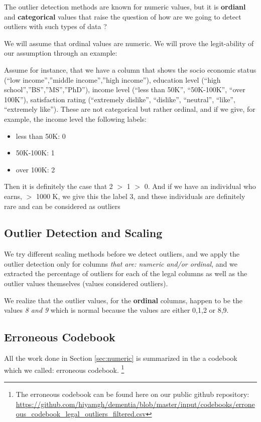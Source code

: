 \documentclass{article}
\begin{document}
\noindent The outlier detection methods are known for numeric values, but it is \textbf{ordianl} and \textbf{categorical} values that raise the question of how are we going to detect outliers with such types of data ?

\noindent We will assume that ordinal values are numeric. We will prove the legit-ability of our assumption through an example:

\noindent Assume for instance, that we have a column that shows the socio economic status (“low income”,”middle income”,”high income”), education level (“high school”,”BS”,”MS”,”PhD”), income level (“less than 50K”, “50K-100K”, “over 100K”), satisfaction rating (“extremely dislike”, “dislike”, “neutral”, “like”, “extremely like”). These are not categorical but rather ordinal, and if we give, for example, the income level the following labels:
\begin{itemize}
    \item less than 50K: 0
    \item 50K-100K: 1
    \item over 100K: 2
\end{itemize}
Then it is definitely the case that 2 $>$ 1 $>$ 0. And if we have an individual who earns, $>$ 1000 K, we give this the label 3, and these individuals are definitely rare and can be considered as outliers

\subsection{Outlier Detection and Scaling}
We try different scaling methods before we detect outliers, and we apply the outlier detection only for columns \textit{that are: numeric and/or ordinal}, and we extracted the percentage of outliers for each of the legal columns as well as the outlier values themselves (values considered outliers).

\noindent We realize that the outlier values, for the \textbf{ordinal} columns, happen to be the values \textit{8 and 9} which is normal because the values are either 0,1,2 or 8,9.

\subsection{Erroneous Codebook}
All the work done in Section \ref{sec:numeric} is summarized in the a codebook which we called: erroneous codebook. \footnote{The erroneous codebook can be found here on our public github repository: \url{https://github.com/hiyamgh/dementia/blob/master/input/codebooks/erroneous_codebook_legal_outliers_filtered.csv}\label{err_codebook}}
\end{document}
